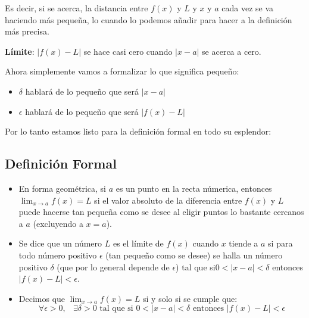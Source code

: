\documentclass[12pt, fleqn]{report}                             %
\DeclareMathOperator \Space {\quad}                             %
\DeclareMathOperator \MiniSpace {\;}                            %
\begin{document}
            Es decir, si se acerca, la distancia entre $f(x)$ y $L$ y $x$ y $a$ cada vez 
            se va haciendo más pequeña, lo cuando lo podemos añadir para hacer a la definición
            más precisa.

            \textbf{Límite}: $|f(x)-L|$ se hace casi cero cuando $|x-a|$ se acerca a cero.

            Ahora simplemente vamos a formalizar lo que significa pequeño:
            \begin{itemize}
                 \item $\delta$ hablará de lo pequeño que será $|x-a|$
                 \item $\epsilon$ hablará de lo pequeño que será $|f(x)-L|$
             \end{itemize} 

            Por lo tanto estamos listo para la definición formal en todo su esplendor:


            \subsection{Definición Formal}

                \begin{itemize}

                    \item
                        En forma geométrica, si $a$ es un punto en la recta númerica, entonces
                        $\lim_{x \to a} f(x) = L$ si el valor absoluto de la diferencia entre
                        $f(x)$ y $L$ puede hacerse tan pequeña como se desee al eligir puntos
                        lo bastante cercanos a $a$ (excluyendo a $x = a$).

                    \item
                        Se dice que un número $L$ es el límite de $f(x)$ cuando $x$ tiende a $a$
                        si para todo número positivo $\epsilon$ (tan pequeño como se desee) se
                        halla un número positivo $\delta$ (que por lo general depende de $\epsilon$)
                        tal que si$0 < |x - a| < \delta$ entonces $|f(x) - L| < \epsilon$.

                    \item 
                        Decimos que $\lim_{x \to a} f(x) = L$ si y solo si se cumple que:
                        \begin{equation*}
                            \forall \epsilon > 0, \MiniSpace
                                \exists \delta > 0 \text{ tal que si }
                                    0 < |x - a| < \delta \text{ entonces } |f(x) - L| < \epsilon 
                        \end{equation*}

                \end{itemize}
\end{document}
